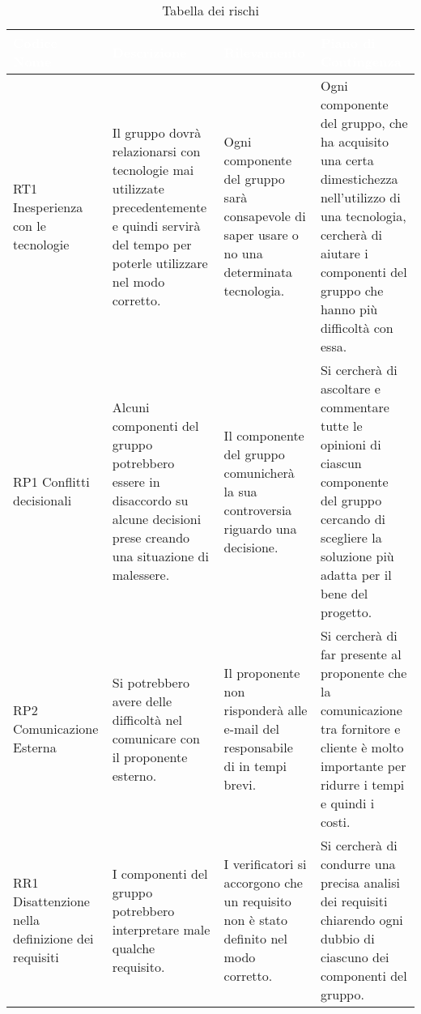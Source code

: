 {
\renewcommand{\arraystretch}{2}
\centering
\begin{longtable}{ C{2.1cm} C{4cm} C{4cm} C{4.9cm}}
\caption{Tabella dei rischi}\\
\textcolor{white}{\textbf{Codice Nome}} & 
\textcolor{white}{\textbf{Descrizione}} & 
\textcolor{white}{\textbf{Rilevamento}} &  
\textcolor{white}{\textbf{Piano di Contingenza}}\\	
\endhead

RT1 \newline Inesperienza con le tecnologie &
Il gruppo dovrà relazionarsi con tecnologie mai utilizzate precedentemente e quindi servirà del tempo per poterle utilizzare nel modo corretto. &
Ogni componente del gruppo sarà consapevole di saper usare o no una determinata tecnologia. &
Ogni componente del gruppo, che ha acquisito una certa dimestichezza nell'utilizzo di una tecnologia, cercherà di aiutare i componenti del gruppo che hanno più difficoltà con essa. \\

RP1 \newline Conflitti decisionali &
Alcuni componenti del gruppo potrebbero essere in disaccordo su alcune decisioni prese creando una situazione di malessere. &
Il componente del gruppo comunicherà la sua controversia riguardo una decisione. &
Si cercherà di ascoltare e commentare tutte le opinioni di ciascun componente del gruppo cercando di scegliere la soluzione più adatta per il bene del progetto. \\ 

RP2 \newline Comunicazione Esterna &
Si potrebbero avere delle difficoltà nel comunicare con il proponente esterno. &
Il proponente non risponderà alle e-mail del responsabile di \Gruppo{} in tempi brevi. &
Si cercherà di far presente al proponente \Proponente{} che la comunicazione tra fornitore e cliente è molto importante per ridurre i tempi e quindi i costi. \\

RR1 \newline Disattenzione nella definizione dei requisiti &
I componenti del gruppo potrebbero interpretare male qualche requisito. &
I verificatori si accorgono che un requisito non è stato definito nel modo corretto. &
Si cercherà di condurre una precisa analisi dei requisiti chiarendo ogni dubbio di ciascuno dei componenti del gruppo. \\


\end{longtable}}
